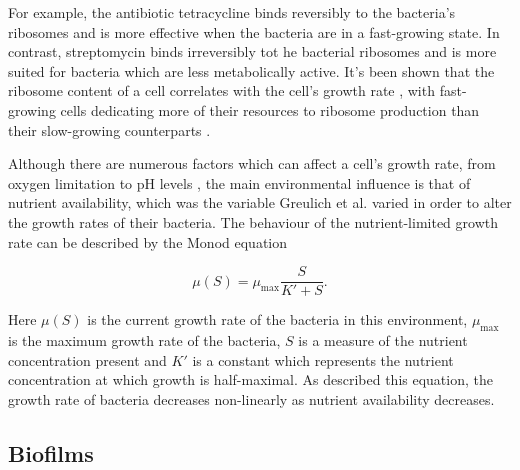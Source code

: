 \documentclass[a4paper,12pt]{article}
\begin{document}
For example, the antibiotic tetracycline binds reversibly to the bacteria's ribosomes and is more effective when the bacteria are in a fast-growing state.  In contrast, streptomycin 
binds irreversibly tot he bacterial ribosomes and is more suited for bacteria which are less metabolically active.  It's been shown that the ribosome content of a cell correlates with 
the cell's growth rate \cite{bioref:Bremer-ribosome-content-2008}, with fast-growing cells dedicating more of their resources to ribosome production than their slow-growing 
counterparts \cite{bioref:Scott-ribosome-content-2010}. 

Although there are numerous factors which can affect a cell's growth rate, from oxygen limitation \cite{bioref:Dalton-oxygen-gRate-1968} to pH levels \cite{bioref:Russell-pH-gRate-1980}, 
the main environmental influence is that of nutrient availability, which was the variable Greulich et al. varied in order to alter the growth rates of their bacteria.  The behaviour 
of the nutrient-limited growth rate can be described by the Monod equation \cite{bioref:Monod-equation-1949} 

\begin{equation}
 \mu(S) = \mu_{\max}\frac{S}{K' + S}.
 \label{eqn:Monod}
\end{equation}

Here $\mu(S)$ is the current growth rate of the bacteria in this environment, $\mu_{\max}$ is the maximum growth rate of the bacteria, $S$ is a measure of the nutrient concentration 
present and $K'$ is a constant which represents the nutrient concentration at which growth is half-maximal.  As described this equation, the growth rate of bacteria decreases non-linearly 
as nutrient availability decreases.


\subsection{Biofilms}

\end{document}
